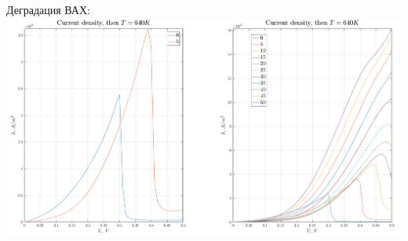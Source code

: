 \documentclass[10pt,pdf,hyperref={unicode},aspectratio={169}]{beamer}
\begin{document}
\begin{frame}
\begin{columns}
		{\color{red} Деградация ВАХ:}\\
	   	\includegraphics[width=.9\linewidth,center]{assets/JDCAlGaAsNd}
	   	\newline\newline\newline\newline
	\end{columns}
\end{frame}
\end{document}
